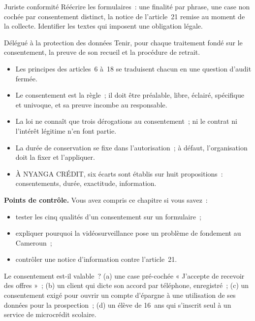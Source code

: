 \begin{boxmetier}{Juriste conformité}
Réécrire les formulaires~: une finalité par phrase, une case non cochée par
consentement distinct, la notice de l'article~21 remise au moment de la
collecte. Identifier les textes qui imposent une obligation légale.
\end{boxmetier}

\begin{boxmetier}{Délégué à la protection des données}
Tenir, pour chaque traitement fondé sur le consentement, la preuve de son
recueil et la procédure de retrait.
\end{boxmetier}

\begin{boxresume}
\begin{itemize}
    \item Les principes des articles~6 à~18 se traduisent chacun en une
          question d'audit fermée.
    \item Le consentement est la règle~; il doit être préalable, libre,
          éclairé, spécifique et univoque, et sa preuve incombe au
          responsable.
    \item La loi ne connaît que trois dérogations au consentement~; ni le
          contrat ni l'intérêt légitime n'en font partie.
    \item La durée de conservation se fixe dans l'autorisation~; à défaut,
          l'organisation doit la fixer et l'appliquer.
    \item À NYANGA CRÉDIT, six écarts sont établis sur huit propositions~:
          consentements, durée, exactitude, information.
\end{itemize}
\end{boxresume}

\begin{boxinfo}
\textbf{Points de contrôle.} Vous avez compris ce chapitre si vous savez~:
\begin{itemize}
    \item tester les cinq qualités d'un consentement sur un formulaire~;
    \item expliquer pourquoi la vidéosurveillance pose un problème de
          fondement au Cameroun~;
    \item contrôler une notice d'information contre l'article~21.
\end{itemize}
\end{boxinfo}

\begin{boxexo}[title={\ding{45}\quad Exercice~2.1. Valable ou non \niveaubase}]
Le consentement est-il valable~? (a) une case pré-cochée « J'accepte de
recevoir des offres »~; (b) un client qui dicte son accord par téléphone,
enregistré~; (c) un consentement exigé pour ouvrir un compte d'épargne à
une utilisation de ses données pour la prospection~; (d) un élève de
16~ans qui s'inscrit seul à un service de microcrédit scolaire.
\end{boxexo}

